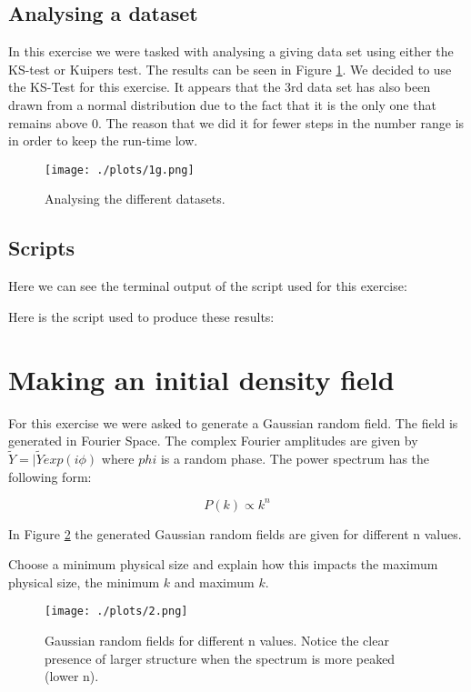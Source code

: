 \documentclass[a4paper,10pt]{article}
\begin{document}
\subsection{Analysing a dataset}

In this exercise we were tasked with analysing a giving data set using either the KS-test or Kuipers test. The results can be seen in Figure \ref{fig:1g}. We decided to use the KS-Test for this exercise. It appears that the 3rd data set has also been drawn from a normal distribution due to the fact that it is the only one that remains above 0. The reason that we did it for fewer steps in the number range is in order to keep the run-time low.

\begin{figure}[h!]
  \centering
  \texttt{[image: ./plots/1g.png]}
  \caption{Analysing the different datasets.}
  \label{fig:1g}
\end{figure}

\subsection{Scripts}

Here we can see the terminal output of the script used for this exercise:


Here is the script used to produce these results: 


\section{Making an initial density field}

For this exercise we were asked to generate a Gaussian random field. The field is generated in Fourier Space. The complex Fourier amplitudes are given by $\tilde{Y}=|\tilde{Y}exp(i\phi)$ where $phi$ is a random phase. The power spectrum has the following form: 

\begin{equation}
P(k) \propto k^n
\end{equation}

In Figure \ref{fig:2} the generated Gaussian random fields are given for different n values. 

\color{red}
Choose a minimum physical size and explain how this impacts the maximum physical size, the minimum $k$ and maximum $k$. 

\color{black}

\begin{figure}[h!]
  \centering
  \texttt{[image: ./plots/2.png]}
  \caption{Gaussian random fields for different n values. Notice the clear presence of larger structure when the spectrum is more peaked (lower n).}
  \label{fig:2}
\end{figure}
\end{document}
